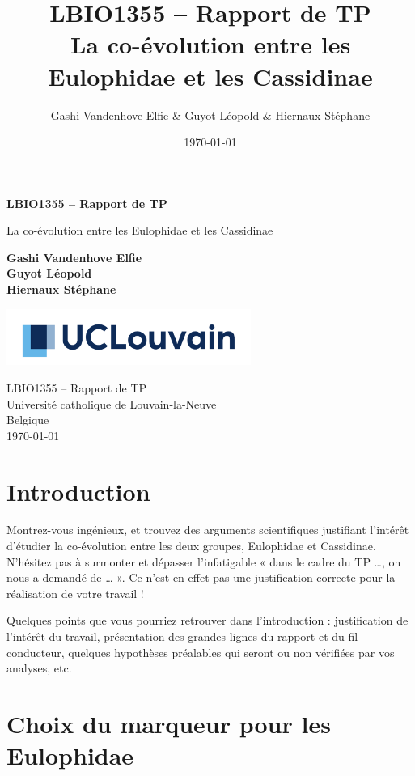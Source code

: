 \documentclass[a4paper, 11pt]{article}
\title{\Large LBIO1355 – Rapport de TP \\
\huge La co-évolution entre les Eulophidae et les Cassidinae}
\author{Gashi Vandenhove Elfie & Guyot Léopold & Hiernaux Stéphane}
\date{\today}
\begin{document}
\begin{titlepage}
   \begin{center}
       \vspace*{1cm}

        \LARGE
       \textbf{ LBIO1355 – Rapport de TP}

       \vspace{0.5cm}
       \Large
       La co-évolution entre les Eulophidae et les Cassidinae
            
       \vspace{1.5cm}
        \Large
       \textbf{Gashi Vandenhove Elfie\\ Guyot Léopold\\ Hiernaux Stéphane}

       \vfill
       \vspace{0.8cm}
     
       \includegraphics[width=0.6\textwidth]{UCLouvain_Logo_Pos_CMJN.pdf}
            
      \large LBIO1355 – Rapport de TP\\
       Université catholique de Louvain-la-Neuve\\
       Belgique\\
       \today
            
   \end{center}
\end{titlepage}

\section{Introduction}
Montrez-vous ingénieux, et trouvez des arguments scientifiques justifiant l’intérêt d’étudier la co-évolution entre les deux groupes, Eulophidae et Cassidinae. N’hésitez pas à surmonter et dépasser l’infatigable « dans le cadre du TP …, on nous a demandé de … ». Ce n’est en effet pas une justification correcte pour la réalisation de votre travail !

Quelques points que vous pourriez retrouver dans l’introduction : justification de l’intérêt du travail, présentation des grandes lignes du rapport et du fil conducteur, quelques hypothèses préalables qui seront ou non vérifiées par vos analyses, etc.

\section{Choix du marqueur pour les Eulophidae}
\end{document}
